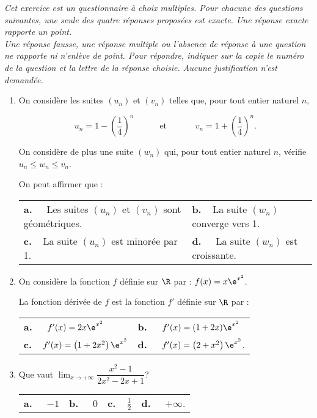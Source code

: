 
\medskip

\emph{Cet exercice est un questionnaire à choix multiples. Pour chacune des questions suivantes, une seule des quatre réponses proposées est exacte. Une réponse exacte rapporte un point. \\
Une réponse fausse, une réponse multiple ou l’absence de réponse à une question ne rapporte ni n’enlève de point. Pour répondre, indiquer sur la copie le numéro de la question et la lettre de la réponse choisie. Aucune justification n’est demandée.}

\medskip

\begin{enumerate}
\item On considère les suites $\left(u_n\right)$ et $\left(v_n\right)$ telles que, pour tout entier naturel $n$,

\[u_n= 1-\left(\frac{1}{4}\right)^n \hspace{3em} \text{et }\hspace{3em} v_n=1+\left(\frac{1}{4}\right)^n.\]

On considère de plus une suite $\left(w_n\right)$ qui, pour tout entier naturel $n$, vérifie $u_n\leqslant w_n\leqslant v_n$.

On peut affirmer que :

\begin{tabularx}{\linewidth}{*{2}{X}}
\textbf{a.~~} Les suites $\left(u_n\right)$ et $\left(v_n\right)$ sont géométriques. &\textbf{b.~~}La suite $(w_n)$ converge vers 1. \\
\textbf{c.~~}La suite $\left(u_n\right)$ est minorée par 1.& \textbf{d.~~} La suite $\left(w_n\right)$ est croissante. 
\end{tabularx}

\item On considère la fonction $f$ définie sur $\R$ par : $f(x)= x\e^{x^2}$.

La fonction dérivée de $f$ est la fonction $f'$ définie sur $\R$ par :

\begin{tabularx}{\linewidth}{*{2}{X}}
\textbf{a.~~} $ f'(x) = 2x\e^{x^2}$&\textbf{b.~~} $ f'(x) = (1+2x) \e^{x^2}$\\
\textbf{c.~~}$ f'(x) = \left(1+2x^2\right) \e^{x^2}$ &\textbf{d.~~} $ f'(x) = \left(2+x^2\right) \e^{x^2} $.  
\end{tabularx}
\item Que vaut $\displaystyle \lim_{x\to +\infty} \dfrac{x^2-1}{2x^2-2x+1}$?

\begin{tabularx}{\linewidth}{*{4}{X}}
\textbf{a.~~} $-1 $ &\textbf{b.~~} $0$&\textbf{c.~~}$\frac{1}{2} $& \textbf{d.~~} $+\infty  $.
\end{tabularx}


\end{enumerate}
